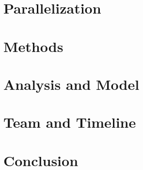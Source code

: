 \documentclass{acm_proc_article-sp}
\begin{document}

\section{Parallelization}


\section{Methods}


\section{Analysis and Model}


\section{Team and Timeline}

\section{Conclusion}


\end{document}
